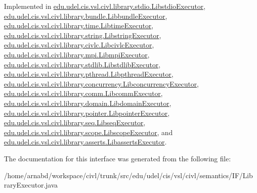 Implemented in \hyperlink{classedu_1_1udel_1_1cis_1_1vsl_1_1civl_1_1library_1_1stdio_1_1LibstdioExecutor_a27f512e778eeaca488868223526fde15}{edu.\+udel.\+cis.\+vsl.\+civl.\+library.\+stdio.\+Libstdio\+Executor}, \hyperlink{classedu_1_1udel_1_1cis_1_1vsl_1_1civl_1_1library_1_1bundle_1_1LibbundleExecutor_a19d1aa506489d9e5351d69c49c90f51f}{edu.\+udel.\+cis.\+vsl.\+civl.\+library.\+bundle.\+Libbundle\+Executor}, \hyperlink{classedu_1_1udel_1_1cis_1_1vsl_1_1civl_1_1library_1_1time_1_1LibtimeExecutor_a4d75c4ed5b84ad8ea1d7caef437ea815}{edu.\+udel.\+cis.\+vsl.\+civl.\+library.\+time.\+Libtime\+Executor}, \hyperlink{classedu_1_1udel_1_1cis_1_1vsl_1_1civl_1_1library_1_1string_1_1LibstringExecutor_a0ace8a486ff508d216d3b3e8024dd976}{edu.\+udel.\+cis.\+vsl.\+civl.\+library.\+string.\+Libstring\+Executor}, \hyperlink{classedu_1_1udel_1_1cis_1_1vsl_1_1civl_1_1library_1_1civlc_1_1LibcivlcExecutor_a10ccbb00d236c1a0c66b93ed83d67e90}{edu.\+udel.\+cis.\+vsl.\+civl.\+library.\+civlc.\+Libcivlc\+Executor}, \hyperlink{classedu_1_1udel_1_1cis_1_1vsl_1_1civl_1_1library_1_1mpi_1_1LibmpiExecutor_a941f2030281bfe6baced8fbcaa59568f}{edu.\+udel.\+cis.\+vsl.\+civl.\+library.\+mpi.\+Libmpi\+Executor}, \hyperlink{classedu_1_1udel_1_1cis_1_1vsl_1_1civl_1_1library_1_1stdlib_1_1LibstdlibExecutor_aad6301cf093b353820dc14451d447890}{edu.\+udel.\+cis.\+vsl.\+civl.\+library.\+stdlib.\+Libstdlib\+Executor}, \hyperlink{classedu_1_1udel_1_1cis_1_1vsl_1_1civl_1_1library_1_1pthread_1_1LibpthreadExecutor_acdc0c2d50350eb58b6e8bda63ddcea7c}{edu.\+udel.\+cis.\+vsl.\+civl.\+library.\+pthread.\+Libpthread\+Executor}, \hyperlink{classedu_1_1udel_1_1cis_1_1vsl_1_1civl_1_1library_1_1concurrency_1_1LibconcurrencyExecutor_ab9fc99d2846f42a5600135abf4796579}{edu.\+udel.\+cis.\+vsl.\+civl.\+library.\+concurrency.\+Libconcurrency\+Executor}, \hyperlink{classedu_1_1udel_1_1cis_1_1vsl_1_1civl_1_1library_1_1comm_1_1LibcommExecutor_a63cdf3422becd2d35181bc01408f7f2a}{edu.\+udel.\+cis.\+vsl.\+civl.\+library.\+comm.\+Libcomm\+Executor}, \hyperlink{classedu_1_1udel_1_1cis_1_1vsl_1_1civl_1_1library_1_1domain_1_1LibdomainExecutor_a3138c3d5ea07443884b5a91f4d321557}{edu.\+udel.\+cis.\+vsl.\+civl.\+library.\+domain.\+Libdomain\+Executor}, \hyperlink{classedu_1_1udel_1_1cis_1_1vsl_1_1civl_1_1library_1_1pointer_1_1LibpointerExecutor_a3c32570966fa2b8c9faaf407c3bdf42b}{edu.\+udel.\+cis.\+vsl.\+civl.\+library.\+pointer.\+Libpointer\+Executor}, \hyperlink{classedu_1_1udel_1_1cis_1_1vsl_1_1civl_1_1library_1_1seq_1_1LibseqExecutor_a405ee05f2c245c3c0e16820c7916ce1d}{edu.\+udel.\+cis.\+vsl.\+civl.\+library.\+seq.\+Libseq\+Executor}, \hyperlink{classedu_1_1udel_1_1cis_1_1vsl_1_1civl_1_1library_1_1scope_1_1LibscopeExecutor_a5e7c37bb53f83b9573ddc7052208e987}{edu.\+udel.\+cis.\+vsl.\+civl.\+library.\+scope.\+Libscope\+Executor}, and \hyperlink{classedu_1_1udel_1_1cis_1_1vsl_1_1civl_1_1library_1_1asserts_1_1LibassertsExecutor_ae3ec1c756bf2a4b23cf37d7d9f74aeb3}{edu.\+udel.\+cis.\+vsl.\+civl.\+library.\+asserts.\+Libasserts\+Executor}.



The documentation for this interface was generated from the following file\+:\begin{DoxyCompactItemize}
\item 
/home/arnabd/workspace/civl/trunk/src/edu/udel/cis/vsl/civl/semantics/\+I\+F/Library\+Executor.\+java\end{DoxyCompactItemize}
